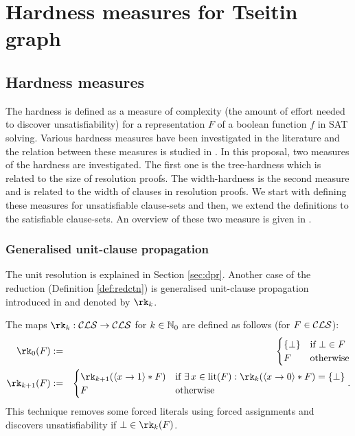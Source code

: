 \documentclass{report}
\begin{document}
\chapter{Hardness measures for Tseitin graph}
\label{cha:Hd-TseitinG}

\section{Hardness measures}
\label{sec:Hardnessmeasures}
The hardness is defined as a measure of complexity (the amount of effort needed to discover unsatisfiability) for a representation $F$ of a boolean function $f$ in SAT solving. Various hardness measures have been investigated in the literature and the relation between these measures is studied in \cite{h5,h18,h8}. In this proposal, two measures of the hardness are investigated. The first one is the tree-hardness which is related to the size of resolution proofs. The width-hardness is the second measure and is related to the width of clauses in resolution proofs. We start with defining these measures for unsatisfiable clause-sets and then, we extend the definitions to the satisfiable clause-sets. An overview of these two measure is given in \cite{h5,h18,?? }.

\subsection{Generalised unit-clause propagation}
\label{sec:rkred}

The unit resolution is explained in Section \ref{sec:dpr}. Another case of the reduction (Definition \ref{def:redctn}) is generalised unit-clause propagation introduced in \cite{h10} and denoted by $\rk_k$. 

\begin{defi}\label{def:rk}
\cite{h10} The maps $\rk_k: \Cls \ra \Cls$ for $k \in \mathbb{N}_0$ are defined as follows (for $F \in \mathcal{CLS}$):
  \begin{eqnarray*}
  \rk_0(F) & := &
  \begin{cases}
  \set{\bot} & \text{if } \bot \in F\\ F & \text{otherwise}
  \end{cases}\\
  \rk_{k+1}(F) & := &
  \begin{cases}
  \rk_{k+1}(\pao x1 * F) & \text{if } \ex\, x \in \lit(F) : \rk_k(\pao x0 * F) = \set{\bot}\\ F & \text{otherwise}
  \end{cases}.
  \end{eqnarray*}
This technique removes some forced literals using forced assignments and discovers unsatisfiability if $\bot \in \rk_k(F)$.
\end{defi} 
\end{document}
